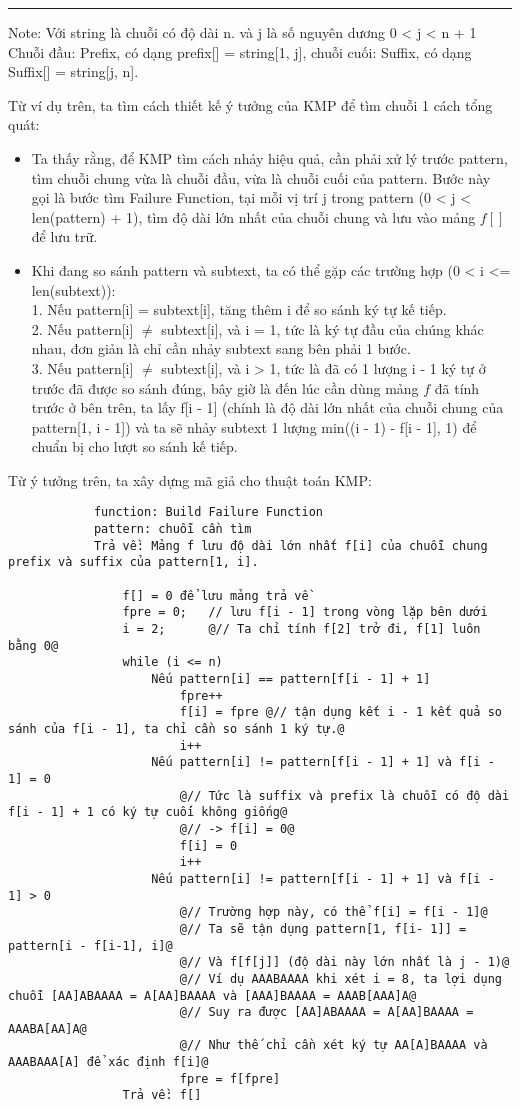 \documentclass[a4paper,11pt]{article}
\begin{document}
\begin{enumerate}
			\vspace*{2mm}
			\hrule			
		
			Note: Với string là chuỗi có độ dài n. và j là số nguyên dương 0 < j < n + 1\\
			Chuỗi đầu: Prefix, có dạng prefix[] = string[1, j], chuỗi cuối: Suffix, có dạng Suffix[] = string[j, n].
				
			Từ ví dụ trên, ta tìm cách thiết kế ý tưởng của KMP để tìm chuỗi 1 cách tổng quát:
			\begin{itemize}
				\item Ta thấy rằng, để KMP tìm cách nhảy hiệu quả, cần phải xử lý trước pattern, tìm chuỗi chung vừa là chuỗi đầu, vừa là chuỗi cuối của pattern.
				Bước này gọi là bước tìm Failure Function, tại mỗi vị trí j trong pattern (0 < j < len(pattern) + 1), tìm độ dài lớn nhất của chuỗi chung và lưu vào mảng $f[]$ để lưu trữ.
				\item Khi đang so sánh pattern và subtext, ta có thể gặp các trường hợp (0 < i <= len(subtext)): \\
				1. Nếu pattern[i] = subtext[i], tăng thêm i để so sánh ký tự kế tiếp. \\
				2. Nếu pattern[i] $\neq$ subtext[i], và i = 1, tức là ký tự đầu của chúng khác nhau, đơn giản là chỉ cần nhảy subtext sang bên phải 1 bước.\\
				3. Nếu pattern[i] $\neq$ subtext[i], và i > 1, tức là đã có 1 lượng i - 1 ký tự ở trước đã được so sánh đúng, bây giờ là đến lúc cần dùng mảng $f$ đã tính trước ở bên trên, ta lấy f[i - 1] 
				(chính là độ dài lớn nhất của chuỗi chung của pattern[1, i - 1]) và ta sẽ nhảy subtext 1 lượng min((i - 1) - f[i - 1], 1) để chuẩn bị cho lượt so sánh kế tiếp.
			\end{itemize}
			
			Từ ý tưởng trên, ta xây dựng mã giả cho thuật toán KMP:

			\begin{lstlisting}
			function: Build Failure Function
			pattern: chuỗi cần tìm 
			Trả về: Mảng f lưu độ dài lớn nhất f[i] của chuỗi chung prefix và suffix của pattern[1, i].

				f[] = 0 để lưu mảng trả về
				fpre = 0;   // lưu f[i - 1] trong vòng lặp bên dưới
				i = 2;		@// Ta chỉ tính f[2] trở đi, f[1] luôn bằng 0@
				while (i <= n)		
					Nếu pattern[i] == pattern[f[i - 1] + 1]
						fpre++
						f[i] = fpre	@// tận dụng kết i - 1 kết quả so sánh của f[i - 1], ta chỉ cần so sánh 1 ký tự.@
						i++
					Nếu pattern[i] != pattern[f[i - 1] + 1] và f[i - 1] = 0
						@// Tức là suffix và prefix là chuỗi có độ dài f[i - 1] + 1 có ký tự cuối không giống@
						@// -> f[i] = 0@
						f[i] = 0
						i++
					Nếu pattern[i] != pattern[f[i - 1] + 1] và f[i - 1] > 0
						@// Trường hợp này, có thể f[i] = f[i - 1]@
						@// Ta sẽ tận dụng pattern[1, f[i- 1]] = pattern[i - f[i-1], i]@
						@// Và f[f[j]] (độ dài này lớn nhất là j - 1)@
						@// Ví dụ AAABAAAA khi xét i = 8, ta lợi dụng chuỗi [AA]ABAAAA = A[AA]BAAAA và [AAA]BAAAA = AAAB[AAA]A@
						@// Suy ra được [AA]ABAAAA = A[AA]BAAAA = AAABA[AA]A@
						@// Như thế chỉ cần xét ký tự AA[A]BAAAA và AAABAAA[A] để xác định f[i]@
						fpre = f[fpre]
				Trả về: f[]


\end{lstlisting}
\end{enumerate}
\end{document}

